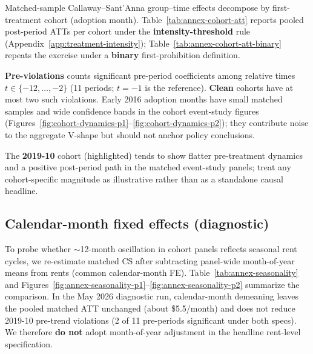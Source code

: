 Matched-sample Callaway--Sant'Anna group--time effects decompose by first-treatment cohort (adoption month).
Table~\ref{tab:annex-cohort-att} reports pooled post-period ATTs per cohort under the \textbf{intensity-threshold} rule (Appendix~\ref{app:treatment-intensity}); Table~\ref{tab:annex-cohort-att-binary} repeats the exercise under a \textbf{binary} first-prohibition definition.

\textbf{Pre-violations} counts significant pre-period coefficients among relative times $t\in\{-12,\ldots,-2\}$ (11 periods; $t=-1$ is the reference).
\textbf{Clean} cohorts have at most two such violations.
Early 2016 adoption months have small matched samples and wide confidence bands in the cohort event-study figures (Figures~\ref{fig:cohort-dynamics-p1}--\ref{fig:cohort-dynamics-p2}); they contribute noise to the aggregate V-shape but should not anchor policy conclusions.

The \textbf{2019-10} cohort (highlighted) tends to show flatter pre-treatment dynamics and a positive post-period path in the matched event-study panels; treat any cohort-specific magnitude as illustrative rather than as a standalone causal headline.

\begin{table}[htbp]
  \centering
  \caption{Cohort pooled post-period ATTs (intensity threshold, $p=0.25$, matched $k=3$).}
  \label{tab:annex-cohort-att}
  \small
  
\end{table}

\begin{table}[htbp]
  \centering
  \caption{Cohort pooled post-period ATTs (binary treatment; matched $k=3$).}
  \label{tab:annex-cohort-att-binary}
  \small
  
\end{table}

\subsection{Calendar-month fixed effects (diagnostic)}\label{app:seasonality}

To probe whether $\sim$12-month oscillation in cohort panels reflects seasonal rent cycles, we re-estimate matched CS after subtracting panel-wide month-of-year means from rents (common calendar-month FE).
Table~\ref{tab:annex-seasonality} and Figures~\ref{fig:annex-seasonality-p1}--\ref{fig:annex-seasonality-p2} summarize the comparison.
In the May 2026 diagnostic run, calendar-month demeaning leaves the pooled matched ATT unchanged (about \$5.5/month) and does not reduce 2019-10 pre-trend violations (2 of 11 pre-periods significant under both specs).
We therefore \textbf{do not} adopt month-of-year adjustment in the headline rent-level specification.

